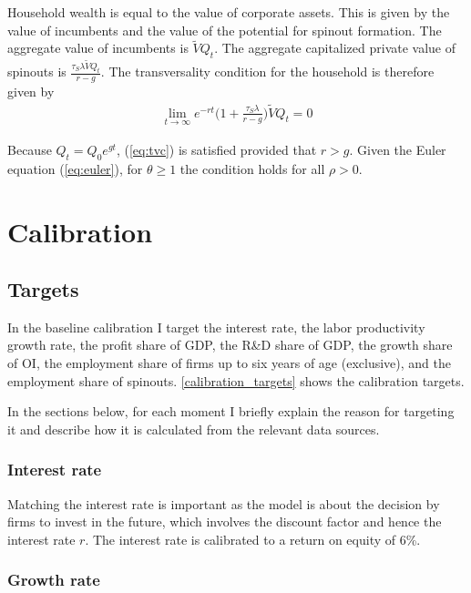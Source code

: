 \documentclass[11pt,english]{article}
\theoremstyle{remark}
\begin{document}
Household wealth is equal to the value of corporate assets. This is given by the value of incumbents and the value of the potential for spinout formation. The aggregate value of incumbents is $\tilde{V}Q_t$. The aggregate capitalized private value of spinouts is $\frac{\tau_S \lambda \tilde{V} Q_t}{r-g}$. The transversality condition for the household is therefore given by 
\begin{align}
	\lim_{t \to \infty} e^{-rt} \big(1 + \frac{\tau_S \lambda }{r-g}\big)\tilde{V} Q_t = 0 \label{eq:tvc}
\end{align}

Because $Q_t = Q_0 e^{gt}$, (\ref{eq:tvc}) is satisfied provided that $r > g$. Given the Euler equation (\ref{eq:euler}), for $\theta \ge 1$ the condition holds for all $\rho > 0$.  

\section{Calibration}

\subsection{Targets}

In the baseline calibration I target the interest rate, the labor productivity growth rate, the profit share of GDP, the R\&D share of GDP, the growth share of OI, the employment share of firms up to six years of age (exclusive), and the employment share of spinouts. \autoref{calibration_targets} shows the calibration targets. 

In the sections below, for each moment I briefly explain the reason for targeting it and describe how it is calculated from the relevant data sources.

\subsubsection{Interest rate}

Matching the interest rate is important as the model is about the decision by firms to invest in the future, which involves the discount factor and hence the interest rate $r$. The interest rate is calibrated to a return on equity of 6\%. 

\subsubsection{Growth rate}
\end{document}
